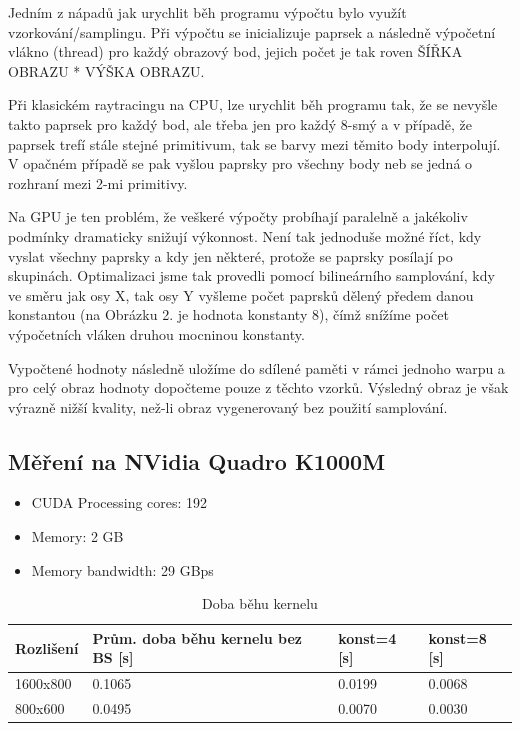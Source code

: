 \documentclass[12pt,a4paper,titlepage,final]{report}
\begin{document}
	\vspace{5mm}
Jedním z nápadů jak urychlit běh programu výpočtu bylo využít vzorkování/samplingu. Při výpočtu se inicializuje paprsek a následně výpočetní vlákno (thread) pro každý obrazový bod, jejich počet je tak roven ŠÍŘKA OBRAZU * VÝŠKA OBRAZU. 
	
	Při klasickém raytracingu na CPU, lze urychlit běh programu tak, že se nevyšle takto paprsek pro každý bod, ale třeba jen pro každý 8-smý a v případě, že paprsek trefí stále stejné primitivum, tak se barvy mezi těmito body interpolují. V opačném případě se pak vyšlou paprsky pro všechny body neb se jedná o rozhraní mezi 2-mi primitivy.
	
	Na GPU je ten problém, že veškeré výpočty probíhají paralelně a jakékoliv podmínky dramaticky snižují výkonnost. Není tak jednoduše možné říct, kdy vyslat všechny paprsky a kdy jen některé, protože se paprsky posílají po skupinách. Optimalizaci jsme tak provedli pomocí bilineárního samplování, kdy ve směru jak osy X, tak osy Y vyšleme počet paprsků dělený předem danou konstantou (na Obrázku 2. je hodnota konstanty 8), čímž snížíme počet výpočetních vláken druhou mocninou konstanty.
	
	Vypočtené hodnoty následně uložíme do sdílené paměti v rámci jednoho warpu a pro celý obraz hodnoty dopočteme pouze z těchto vzorků. Výsledný obraz je však výrazně nižší kvality, než-li obraz vygenerovaný bez použití samplování.


\subsection{Měření na NVidia Quadro K1000M}
\begin{itemize}
	\item CUDA Processing cores: 192
	\item Memory: 2 GB
	\item Memory bandwidth: 29 GBps 
\end{itemize}	
	
\begin{table}[h!]
	\begin{center}
    \begin{tabular}{ | p{3.5cm} | p{3.5cm} | p{3.5cm} | p{3.5cm} |}
    \hline
    Rozlišení & Prům. doba běhu kernelu bez BS [s]& konst=4 [s]& konst=8 [s]
    \\ \hline
    
	1600x800 & 0.1065 & 0.0199 & 0.0068
	\\ \hline
	
	800x600 & 0.0495 & 0.0070 & 0.0030
	\\ \hline
	
    \end{tabular}
	\end{center}	
	\caption{Doba běhu kernelu}  
\end{table}
\end{document}

